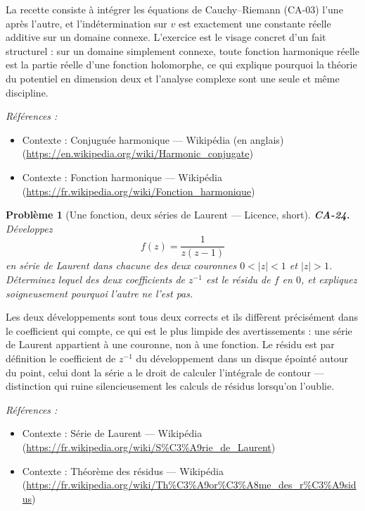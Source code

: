\documentclass[11pt]{article}
\newtheorem{problem}{Problème}
\newenvironment{refs}{\par\small\noindent\emph{Références :}\begin{itemize}\setlength\itemsep{0pt}}{\end{itemize}\normalsize}
\begin{document}
\noindent La recette consiste à intégrer les équations de Cauchy--Riemann (CA-03) l'une
après l'autre, et l'indétermination sur $ v $ est exactement une constante réelle additive sur un
domaine connexe. L'exercice est le visage concret d'un fait structurel : sur un domaine simplement
connexe, toute fonction harmonique réelle est la partie réelle d'une fonction holomorphe, ce qui
explique pourquoi la théorie du potentiel en dimension deux et l'analyse complexe sont une seule et
même discipline.

\begin{refs}
\item Contexte : Conjuguée harmonique --- Wikipédia (en anglais) (\url{https://en.wikipedia.org/wiki/Harmonic_conjugate})
\item Contexte : Fonction harmonique --- Wikipédia (\url{https://fr.wikipedia.org/wiki/Fonction_harmonique})
\end{refs}

\bigskip

\begin{problem}[{Une fonction, deux séries de Laurent --- Licence, short}]
\textbf{CA-24.} Développez
\[ f(z) = \frac{1}{z(z-1)} \]
en série de Laurent dans chacune des deux couronnes $ 0 < |z| < 1 $ et $ |z| > 1 $.
Déterminez lequel des deux coefficients de $ z^{-1} $ est le résidu de $ f $ en $ 0 $, et
expliquez soigneusement pourquoi l'autre ne l'est pas.
\end{problem}

\noindent Les deux développements sont tous deux corrects et ils diffèrent précisément dans
le coefficient qui compte, ce qui est le plus limpide des avertissements : une série de Laurent
appartient à une couronne, non à une fonction. Le résidu est par définition le coefficient de
$ z^{-1} $ du développement dans un disque épointé autour du point, celui dont la série a le droit
de calculer l'intégrale de contour --- distinction qui ruine silencieusement les calculs de résidus
lorsqu'on l'oublie.

\begin{refs}
\item Contexte : Série de Laurent --- Wikipédia (\url{https://fr.wikipedia.org/wiki/S%C3%A9rie_de_Laurent})
\item Contexte : Théorème des résidus --- Wikipédia (\url{https://fr.wikipedia.org/wiki/Th%C3%A9or%C3%A8me_des_r%C3%A9sidus})
\end{refs}

\bigskip
\end{document}
